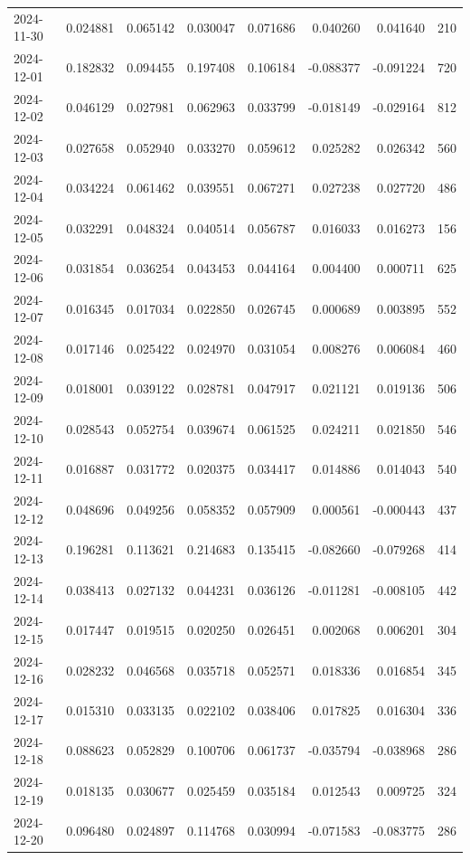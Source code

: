 \begin{tabular}{lrrrrrrr}
2024-11-30 & 0.024881 & 0.065142 & 0.030047 & 0.071686 & 0.040260 & 0.041640 & 210 \\
2024-12-01 & 0.182832 & 0.094455 & 0.197408 & 0.106184 & -0.088377 & -0.091224 & 720 \\
2024-12-02 & 0.046129 & 0.027981 & 0.062963 & 0.033799 & -0.018149 & -0.029164 & 812 \\
2024-12-03 & 0.027658 & 0.052940 & 0.033270 & 0.059612 & 0.025282 & 0.026342 & 560 \\
2024-12-04 & 0.034224 & 0.061462 & 0.039551 & 0.067271 & 0.027238 & 0.027720 & 486 \\
2024-12-05 & 0.032291 & 0.048324 & 0.040514 & 0.056787 & 0.016033 & 0.016273 & 156 \\
2024-12-06 & 0.031854 & 0.036254 & 0.043453 & 0.044164 & 0.004400 & 0.000711 & 625 \\
2024-12-07 & 0.016345 & 0.017034 & 0.022850 & 0.026745 & 0.000689 & 0.003895 & 552 \\
2024-12-08 & 0.017146 & 0.025422 & 0.024970 & 0.031054 & 0.008276 & 0.006084 & 460 \\
2024-12-09 & 0.018001 & 0.039122 & 0.028781 & 0.047917 & 0.021121 & 0.019136 & 506 \\
2024-12-10 & 0.028543 & 0.052754 & 0.039674 & 0.061525 & 0.024211 & 0.021850 & 546 \\
2024-12-11 & 0.016887 & 0.031772 & 0.020375 & 0.034417 & 0.014886 & 0.014043 & 540 \\
2024-12-12 & 0.048696 & 0.049256 & 0.058352 & 0.057909 & 0.000561 & -0.000443 & 437 \\
2024-12-13 & 0.196281 & 0.113621 & 0.214683 & 0.135415 & -0.082660 & -0.079268 & 414 \\
2024-12-14 & 0.038413 & 0.027132 & 0.044231 & 0.036126 & -0.011281 & -0.008105 & 442 \\
2024-12-15 & 0.017447 & 0.019515 & 0.020250 & 0.026451 & 0.002068 & 0.006201 & 304 \\
2024-12-16 & 0.028232 & 0.046568 & 0.035718 & 0.052571 & 0.018336 & 0.016854 & 345 \\
2024-12-17 & 0.015310 & 0.033135 & 0.022102 & 0.038406 & 0.017825 & 0.016304 & 336 \\
2024-12-18 & 0.088623 & 0.052829 & 0.100706 & 0.061737 & -0.035794 & -0.038968 & 286 \\
2024-12-19 & 0.018135 & 0.030677 & 0.025459 & 0.035184 & 0.012543 & 0.009725 & 324 \\
2024-12-20 & 0.096480 & 0.024897 & 0.114768 & 0.030994 & -0.071583 & -0.083775 & 286 \\

\end{tabular}
